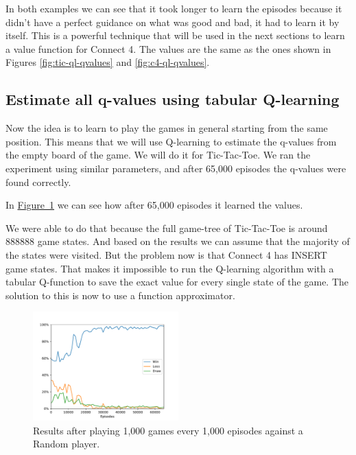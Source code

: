 \documentclass{article}
\newcommand{\GithubURL}[1]{[\href{https://github.com/davidrobles/mlnd-capstone-code/blob/master/#1}{source}]}
\begin{document}

In both examples we can see that it took longer to learn the episodes because it didn't have a
perfect guidance on what was good and bad, it had to learn it by itself. This is a powerful
technique that will be used in the next sections to learn a value function for Connect 4. The values
are the same as the ones shown in Figures \hyperref[fig:tic-ql-qvalues]{\ref*{fig:tic-ql-qvalues}}
and \hyperref[fig:c4-ql-qvalues]{\ref*{fig:c4-ql-qvalues}}.

\subsection{Estimate all q-values using tabular Q-learning}


Now the idea is to learn to play the games in general starting from the same position. This means
that we will use Q-learning to estimate the q-values from the empty board of the game. We will do it
for Tic-Tac-Toe. We ran the experiment using similar parameters, and after 65,000 episodes the
q-values were found correctly.


In \hyperref[fig:tic-ql-tab-full-wld-plot]{Figure~\ref*{fig:tic-ql-tab-full-wld-plot}} we can see
how after 65,000 episodes it learned the values.

We were able to do that because the full game-tree of Tic-Tac-Toe is around 888888 game states. And
based on the results we can assume that the majority of the states were visited. But the problem now
is that Connect 4 has INSERT game states. That makes it impossible to run the Q-learning algorithm
with a tabular Q-function to save the exact value for every single state of the game. The solution
to this is now to use a function approximator.

\begin{figure}[!h]
    \centering
    \includegraphics[width=0.50\textwidth]{figures/tic_ql_tab_full_wld_plot.pdf}
    \caption{Results after playing 1,000 games every 1,000 episodes against a Random player.}
    \label{fig:tic-ql-tab-full-wld-plot}
\end{figure}
\end{document}
